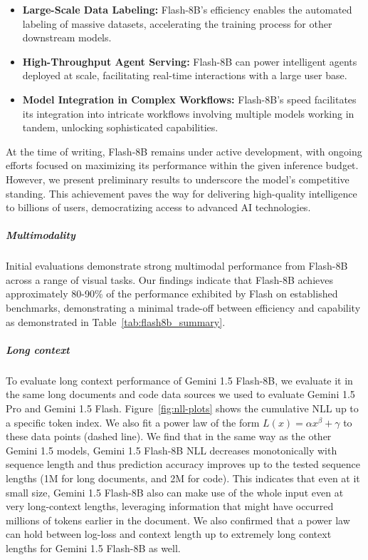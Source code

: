 \begin{itemize}
\item \textbf{Large-Scale Data Labeling:} Flash-8B's efficiency enables the automated labeling of massive datasets, accelerating the training process for other downstream models.
\item \textbf{High-Throughput Agent Serving:} Flash-8B can power intelligent agents deployed at scale, facilitating real-time interactions with a large user base.
\item \textbf{Model Integration in Complex Workflows:} Flash-8B's speed facilitates its integration into intricate workflows involving multiple models working in tandem, unlocking sophisticated capabilities.
\end{itemize}

At the time of writing, Flash-8B remains under active development, with ongoing efforts focused on maximizing its performance within the given inference budget. However, we present preliminary results to underscore the model's competitive standing. This achievement paves the way for delivering high-quality intelligence to billions of users, democratizing access to advanced AI technologies.

\subparagraph{Multimodality}

Initial evaluations demonstrate strong multimodal performance from Flash-8B across a range of visual tasks. Our findings indicate that Flash-8B achieves approximately 80-90\% of the performance exhibited by Flash on established benchmarks, demonstrating a minimal trade-off between efficiency and capability as demonstrated in Table~\ref{tab:flash8b_summary}.

\subparagraph{Long context}

To evaluate long context performance of Gemini 1.5 Flash-8B, we evaluate it in the same long documents and code data sources we used to evaluate Gemini 1.5 Pro and Gemini 1.5 Flash. Figure~\ref{fig:nll-plots} shows the cumulative NLL up to a specific token index. We also fit a power law of the form $L(x) =\alpha x^\beta + \gamma$ to these data points (dashed line). We find that in the same way as the other Gemini 1.5 models, Gemini 1.5 Flash-8B NLL decreases monotonically with sequence length and thus prediction accuracy improves up to the tested sequence lengths (1M for long documents, and 2M for code). This indicates that even at it small size, Gemini 1.5 Flash-8B also can make use of the whole input even at very long-context lengths, leveraging information that might have occurred millions of tokens earlier in the document. We also confirmed that a power law can hold between log-loss and context length up to extremely long context lengths for Gemini 1.5 Flash-8B as well.

